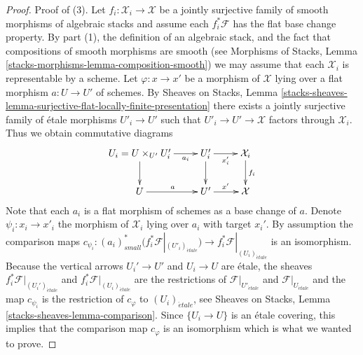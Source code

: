 \documentclass{stacks-project}
\theoremstyle{plain}
\theoremstyle{definition}
\theoremstyle{remark}
\numberwithin{equation}{subsection}
\def\etale{{\acute{e}tale}}
\begin{document}
\begin{proof}
\medskip\noindent
Proof of (3).
Let $f_i : \mathcal{X}_i \to \mathcal{X}$ be a jointly surjective family of
smooth morphisms of algebraic stacks and assume each $f_i^*\mathcal{F}$
has the flat base change property. By part (1), the definition of
an algebraic stack, and the fact that compositions of smooth morphisms
are smooth (see
Morphisms of Stacks, Lemma \ref{stacks-morphisms-lemma-composition-smooth})
we may assume that each $\mathcal{X}_i$ is representable by a scheme.
Let $\varphi : x \to x'$ be a morphism of $\mathcal{X}$ lying over
a flat morphism $a : U \to U'$ of schemes. By
Sheaves on Stacks, Lemma
\ref{stacks-sheaves-lemma-surjective-flat-locally-finite-presentation}
there exists a jointly surjective family of \'etale morphisms
$U'_i \to U'$ such that $U'_i \to U' \to \mathcal{X}$ factors through
$\mathcal{X}_i$. Thus we obtain commutative diagrams
$$
\xymatrix{
U_i = U \times_{U'} U_i' \ar[r]_-{a_i} \ar[d] &
U_i' \ar[r]_{x_i'} \ar[d] & \mathcal{X}_i \ar[d]^{f_i} \\
U \ar[r]^a & U' \ar[r]^{x'} & \mathcal{X}
}
$$
Note that each $a_i$ is a flat morphism of schemes as a base change of $a$.
Denote $\psi_i : x_i \to x'_i$ the morphism of $\mathcal{X}_i$ lying over
$a_i$ with target $x_i'$. By assumption the comparison maps
$c_{\psi_i} :
(a_i)_{small}^*\big(f_i^*\mathcal{F}|_{(U'_i)_\etale}\big)
\to f_i^*\mathcal{F}|_{(U_i)_\etale}$ is an isomorphism.
Because the vertical arrows $U_i' \to U'$ and $U_i \to U$ are \'etale,
the sheaves $f_i^*\mathcal{F}|_{(U_i')_\etale}$ and
$f_i^*\mathcal{F}|_{(U_i)_\etale}$ are the restrictions of
$\mathcal{F}|_{U'_\etale}$ and $\mathcal{F}|_{U_\etale}$
and the map $c_{\psi_i}$ is the restriction of $c_\varphi$ to
$(U_i)_\etale$, see
Sheaves on Stacks, Lemma \ref{stacks-sheaves-lemma-comparison}.
Since $\{U_i \to U\}$ is an \'etale covering, this implies
that the comparison map $c_\varphi$ is an isomorphism which is what
we wanted to prove.


\end{proof}
\end{document}

